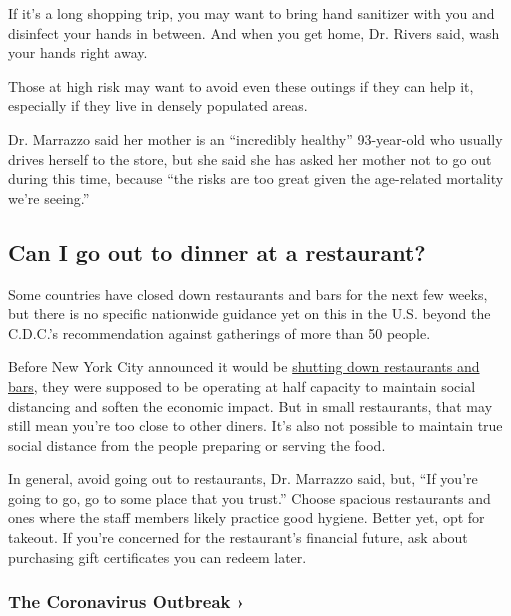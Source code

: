 If it's a long shopping trip, you may want to bring hand sanitizer with
you and disinfect your hands in between. And when you get home, Dr.
Rivers said, wash your hands right away.

Those at high risk may want to avoid even these outings if they can help
it, especially if they live in densely populated areas.

Dr. Marrazzo said her mother is an ``incredibly healthy'' 93-year-old
who usually drives herself to the store, but she said she has asked her
mother not to go out during this time, because ``the risks are too great
given the age-related mortality we're seeing.''

\hypertarget{can-i-go-out-to-dinner-at-a-restaurant}{%
\subsection{Can I go out to dinner at a
restaurant?}\label{can-i-go-out-to-dinner-at-a-restaurant}}

Some countries have closed down restaurants and bars for the next few
weeks, but there is no specific nationwide guidance yet on this in the
U.S. beyond the C.D.C.'s recommendation against gatherings of more than
50 people.

Before New York City announced it would be
\href{https://www.nytimes3xbfgragh.onion/2020/03/15/nyregion/new-york-coronavirus.html\#link-709bff21}{shutting
down restaurants and bars}, they were supposed to be operating at half
capacity to maintain social distancing and soften the economic impact.
But in small restaurants, that may still mean you're too close to other
diners. It's also not possible to maintain true social distance from the
people preparing or serving the food.

In general, avoid going out to restaurants, Dr. Marrazzo said, but, ``If
you're going to go, go to some place that you trust.'' Choose spacious
restaurants and ones where the staff members likely practice good
hygiene. Better yet, opt for takeout. If you're concerned for the
restaurant's financial future, ask about purchasing gift certificates
you can redeem later.

\href{https://www.nytimes3xbfgragh.onion/news-event/coronavirus?action=click\&pgtype=Article\&state=default\&region=MAIN_CONTENT_3\&context=storylines_faq}{}

\hypertarget{the-coronavirus-outbreak-}{%
\subsubsection{The Coronavirus Outbreak
›}\label{the-coronavirus-outbreak-}}

